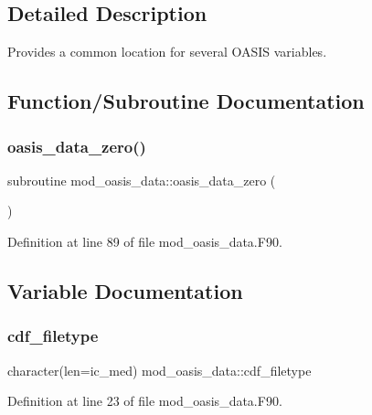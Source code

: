 \subsection{Detailed Description}
Provides a common location for several O\+A\+S\+IS variables. 

\subsection{Function/\+Subroutine Documentation}
\mbox{\label{namespacemod__oasis__data_a7a3b7c8004b8d8869bbfa1fd4723da3e}} 
\subsubsection{\texorpdfstring{oasis\+\_\+data\+\_\+zero()}{oasis\_data\_zero()}}
{\footnotesize\ttfamily subroutine mod\+\_\+oasis\+\_\+data\+::oasis\+\_\+data\+\_\+zero (\begin{DoxyParamCaption}{ }\end{DoxyParamCaption})}



Definition at line 89 of file mod\+\_\+oasis\+\_\+data.\+F90.



\subsection{Variable Documentation}
\mbox{\label{namespacemod__oasis__data_adf52e0e1baededb92201f7592811d00d}} 
\subsubsection{\texorpdfstring{cdf\+\_\+filetype}{cdf\_filetype}}
{\footnotesize\ttfamily character(len=ic\+\_\+med) mod\+\_\+oasis\+\_\+data\+::cdf\+\_\+filetype}



Definition at line 23 of file mod\+\_\+oasis\+\_\+data.\+F90.

